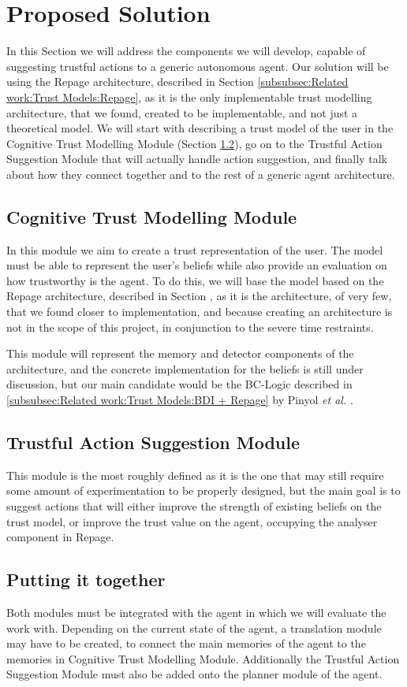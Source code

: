 \section{Proposed Solution}
\label{sec:Solution}
In this Section we will address the components we will develop, capable of suggesting trustful actions to a generic autonomous agent. Our solution will be using the Repage architecture, described in Section \ref{subsubsec:Related work:Trust Models:Repage}, as it is the only implementable trust modelling architecture, that we found, created to be implementable, and not just a theoretical model. We will start with describing a trust model of the user in the Cognitive Trust Modelling Module (Section \ref{subsec:Solution:Trust Decision Making Module}), go on to the Trustful Action Suggestion Module that will actually handle action suggestion, and finally talk about how they connect together and to the rest of a generic agent architecture.


\subsection{Cognitive Trust Modelling Module}
\label{subsec:Solution:Trust Assessment Module}
In this module we aim to create a trust representation of the user. The model must be able to represent the user's beliefs while also provide an evaluation on how trustworthy is the agent. To do this, we will base the model based on the Repage architecture, described in Section , as it is the architecture, of very few, that we found closer to implementation, and because creating an architecture is not in the scope of this project, in conjunction to the severe time restraints.

This module will represent the memory and detector components of the architecture, and the concrete implementation for the beliefs is still under discussion, but our main candidate would be the BC-Logic described in \ref{subsubsec:Related work:Trust Models:BDI + Repage} by Pinyol \textit{et al.} \cite{Pinyol2009}.

\subsection{Trustful Action Suggestion Module}
\label{subsec:Solution:Trust Decision Making Module}
This module is the most roughly defined as it is the one that may still require some amount of experimentation to be properly designed, but the main goal is to suggest actions that will either improve the strength of existing beliefs on the trust model, or improve the trust value on the agent, occupying the analyser component in Repage.

\subsection{Putting it together}
Both modules must be integrated with the agent in which we will evaluate the work with. Depending on the current state of the agent, a translation module may have to be created, to connect the main memories of the agent to the memories in Cognitive Trust Modelling Module. Additionally the Trustful Action Suggestion Module must also be added onto the planner module of the agent.